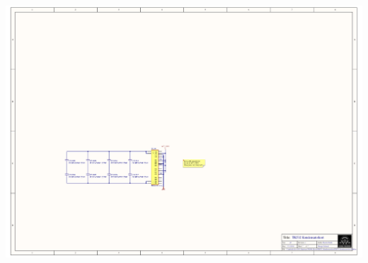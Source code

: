 \includegraphics[page=7,height=\textheight,width=\textwidth,keepaspectratio]{TK532_Kondensatorkort.PDF}
%